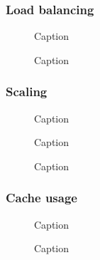 \subsubsection{Load balancing}
\begin{figure}
    \centering
    
    \caption{Caption}
    \label{fig:load_balancing}
\end{figure}

\begin{figure}
    \centering
    
    \caption{Caption}
    \label{fig:load_balancing_material_model}
\end{figure}

\subsubsection{Scaling}

\begin{figure}
    \centering
    
    \caption{Caption}
    \label{fig:my_label}
\end{figure}

\begin{figure}
    \centering
    
    \caption{Caption}
    \label{fig:my_label}
\end{figure}

\begin{figure}
    \centering
    
    \caption{Caption}
    \label{fig:my_label}
\end{figure}

\subsubsection{Cache usage}

\begin{figure}
    \centering
    
    \caption{Caption}
    \label{fig:my_label}
\end{figure}

\begin{figure}
    \centering
    
    \caption{Caption}
    \label{fig:my_label}
\end{figure}
